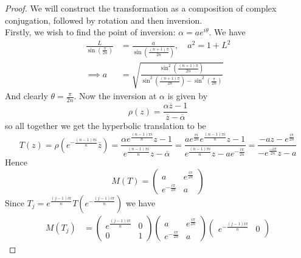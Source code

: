 \documentclass[reqno]{amsart}
\theoremstyle{definition}
\theoremstyle{remark}
\begin{document}
\begin{proof}
        We will construct the transformation as a composition of
        complex conjugation, followed by rotation and then inversion.\\
        Firstly, we wish to find the point of inversion: $\alpha = 
        a e^{i \theta}$.
        We have
        \begin{align*}
            \frac{L}{\sin \left( \frac{\pi}{2n} \right) }
            &= \frac{a}{\sin \left( \frac{(n+1) \pi}{2n} \right) }, \quad
            a^2 = 1 + L^2\\
            \implies a &= \sqrt{\frac{\sin^2 \left( \frac{(n+1)\pi}{2n} \right) }{
            \sin^2 \left( \frac{(n+1) \pi}{2n} \right) -
    \sin^2 \left( \frac{\pi}{2n} \right) }} \label{Omega}\tag{$\Omega$}
        \end{align*}
        And clearly $\theta = \frac{\pi}{2n}$. Now the inversion
        at $\alpha$ is given by
        \[
        \rho (z) = \frac{\alpha \overline{z} - 1}{\overline{z} - 
        \overline{\alpha}}
        \] 
        so all together we get the hyperbolic translation to be
        \[
        T(z) = \rho \left( e^{- \frac{(n-1)\pi i}{n}} \overline{z} \right) 
        = \frac{\alpha e^{\frac{(n-1) \pi i}{n}} z - 1}{
        e^{\frac{(n-1) \pi i}{n}} z - \overline{\alpha}}
        = \frac{a e^{\frac{\pi i}{2n}} e^{\frac{(n-1) \pi i}{n}} z - 1}{
        e^{\frac{(n-1) \pi i}{n} }z - a e^{- \frac{i \pi}{2n}}}
        = \frac{-a z - e^{\frac{i \pi}{2n}}}{-e^{\frac{- i \pi}{2n}} z-
        a}
        \] 
        Hence
        \[
        M(T) = 
        \begin{pmatrix} 
            a & e^{\frac{i \pi}{2n}}\\
            e^{- \frac{i \pi}{2n}} & a
        \end{pmatrix} 
        \] 
        Since $T_j = e^{\frac{(j-1) i \pi}{n}} T\left( 
        e^{- \frac{(j-1) i \pi}{n}} \right) $ we have
        \begin{align*}
            M(T_j) 
            &= \begin{pmatrix} e^{\frac{(j-1) i \pi}{n}} & 0 \\
            0 & 1\end{pmatrix} 
            \begin{pmatrix} a & e^{\frac{i \pi}{2n}}\\
            e^{- \frac{i \pi}{2n}} & a\end{pmatrix} 
                \begin{pmatrix} e^{- \frac{(j-1) i \pi}{n}} & 0\\

\end{pmatrix}
\end{align*}
\end{proof}
\end{document}

